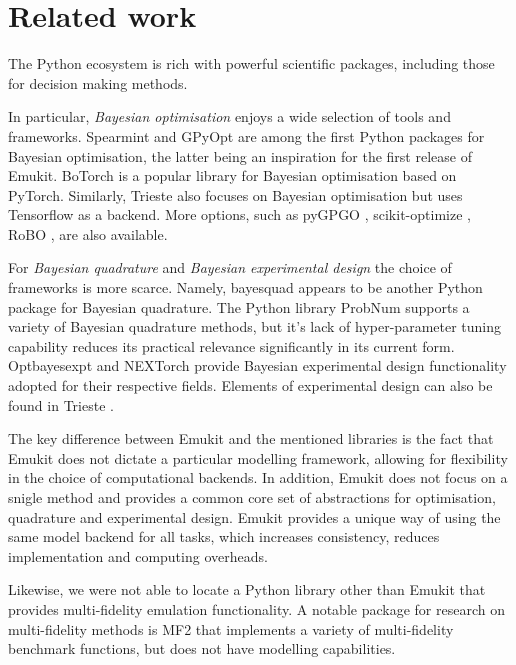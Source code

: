 \section{Related work}
The Python ecosystem is rich with powerful scientific packages, including those for decision making methods.

In particular, \emph{Bayesian optimisation} enjoys a wide selection of tools and frameworks. Spearmint \cite{snoek2012practical} and GPyOpt \cite{gpyopt2016} are among the first Python packages for Bayesian optimisation, the latter being an inspiration for the first release of Emukit. BoTorch \cite{balandat2020botorch} is a popular library for Bayesian optimisation based on PyTorch. Similarly, Trieste \cite{picheny2023trieste} also focuses on Bayesian optimisation but uses Tensorflow as a backend. More options, such as pyGPGO \cite{jimenez2017pygpgo}, scikit-optimize \cite{louppe2017bayesian}, RoBO \cite{klein-bayesopt17}, are also available.

For \emph{Bayesian quadrature} and \emph{Bayesian experimental design} the choice of frameworks is more scarce. Namely, bayesquad \cite{Charles2013} appears to be another Python package for Bayesian quadrature. The Python library ProbNum \cite{Wenger21} supports a variety of Bayesian quadrature methods, but it's lack of hyper-parameter tuning capability reduces its practical relevance significantly in its current form. Optbayesexpt \cite{mcmichael2021optbayesexpt} and NEXTorch \cite{wang2021nextorch} provide Bayesian experimental design functionality adopted for their respective fields. Elements of experimental design can also be found in Trieste \cite{picheny2023trieste}.

The key difference between Emukit and the mentioned libraries is the fact that Emukit does not dictate a particular modelling framework, allowing for flexibility in the choice of computational backends. In addition, Emukit does not focus on a snigle method and provides a common core set of abstractions for optimisation, quadrature and experimental design. Emukit provides a unique way of using the same model backend for all tasks, which increases consistency, reduces implementation and computing overheads.

Likewise, we were not able to locate a Python library other than Emukit that provides multi-fidelity emulation functionality. A notable package for research on multi-fidelity methods is MF2 \cite{vanRijn2020} that implements a variety of multi-fidelity benchmark functions, but does not have modelling capabilities.

